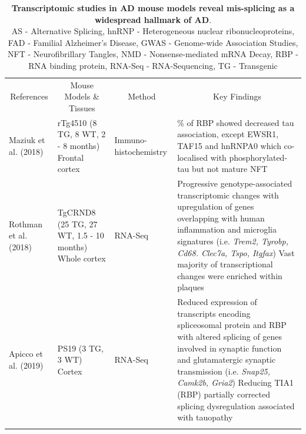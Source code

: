 \begin{changemargin}{1.5cm}
	\begin{landscape}
		\small %
		\setlength\tabcolsep{2pt} %
		\renewcommand{\arraystretch}{1.2}
		\begin{longtable}[c]{p{3cm}p{4cm}p{3cm}p{16cm}}
			\captionsetup{width=1.6\textwidth}
			\caption[Transcriptomic studies in AD mouse models]%
			{\textbf{Transcriptomic studies in AD mouse models reveal mis-splicing as a widespread hallmark of AD}. \newline AS - Alternative Splicing, hnRNP - Heterogeneous nuclear ribonucleoproteins, FAD - Familial Alzheimer's Disease, GWAS - Genome-wide Association Studies, NFT - Neurofibrillary Tangles, NMD - Nonsense-mediated mRNA Decay, RBP - RNA binding protein, RNA-Seq - RNA-Sequencing, TG - Transgenic}
			\label{tab: AS_ADMouse_studies}\\
			\toprule
			\multicolumn{1}{c}{References} &
			\multicolumn{1}{c}{Mouse Models \& Tissues} &
			\multicolumn{1}{c}{Method} &
			\multicolumn{1}{c}{Key Findings} \\* \midrule
			\endfirsthead			\endhead			\bottomrule			\endfoot			\endlastfoot	
			
			\centering Maziuk et al. (2018)\cite{Maziuk2018} &
			\centering rTg4510 (8 TG, 8 WT, 2 - 8 months) Frontal cortex&
			\centering Immuno-\newline histochemistry &
			\tabitem 65\% of RBP showed decreased tau association, except EWSR1, TAF15 and hnRNPA0 which co-localised with phosphorylated-tau but not mature NFT \\
			\hdashline[0.5pt/5pt]
			
			\centering Rothman et al. (2018)\cite{Rothman2018}&
			\centering TgCRND8 (25 TG, 27 WT, 1.5 - 10 months) \newline Whole cortex&
			\centering RNA-Seq &
			\tabitem Progressive genotype-associated transcriptomic changes with upregulation of genes overlapping with human inflammation and microglia signatures (i.e. \textit{Trem2, Tyrobp, Cd68. Clec7a, Tspo, Itgfax}) \newline
			\tabitem Vast majority of transcriptional changes were enriched within plaques  \\
			\hdashline[0.5pt/5pt]
			
			\centering Apicco et al. (2019) \cite{Apicco2019} &
			\centering PS19 (3 TG, 3 WT) \newline Cortex &
			\centering RNA-Seq &
			\tabitem Reduced expression of transcripts encoding spliceosomal protein and RBP with altered splicing of genes involved in synaptic function and glutamatergic synaptic transmission (i.e. \textit{Snap25, Camk2b, Gria2})
			\tabitem Reducing TIA1 (RBP) partially corrected splicing dysregulation associated with tauopathy \\
			\hdashline[0.5pt/5pt]
			

\end{longtable}
\end{landscape}
\end{changemargin}
